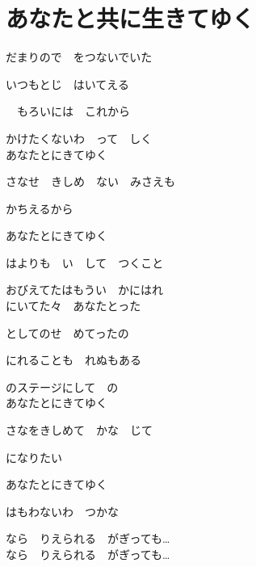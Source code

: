 \section{ あなたと共に生きてゆく}
\large{

だまりので　をつないでいた

いつもとじ　はいてえる

　もろいには　これから

かけたくないわ　って　しく
\\

あなたとにきてゆく

さなせ　きしめ　ない　みさえも

かちえるから

あなたとにきてゆく

はよりも　い　して　つくこと

おびえてたはもうい　かにはれ
\\

にいてた々　あなたとった

としてのせ　めてったの

にれることも　れぬもある

のステージにして　の
\\

あなたとにきてゆく

さなをきしめて　かな　じて

になりたい

あなたとにきてゆく

はもわないわ　つかな

なら　りえられる　がぎっても…
\\

なら　りえられる　がぎっても…

}